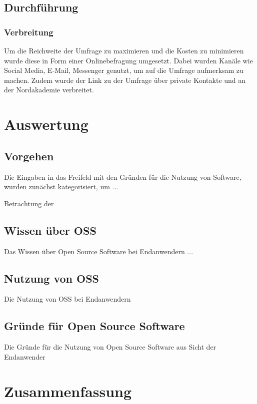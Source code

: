 \documentclass[a4paper]{article}
\begin{document}
		\subsection{Durchführung}
            \subsubsection{Verbreitung}
                Um die Reichweite der Umfrage zu maximieren und die Kosten zu minimieren wurde diese in Form einer Onlinebefragung umgesetzt. Dabei wurden Kanäle wie Social Media, E-Mail, Messenger genutzt, um auf die Umfrage aufmerksam zu machen. Zudem wurde der Link zu der Umfrage über private Kontakte und an der Nordakademie verbreitet.
                
    \section{Auswertung}
        \subsection{Vorgehen}
            Die Eingaben in das Freifeld mit den Gründen für die Nutzung von Software, wurden zunächst kategorisiert, um ...
            
            Betrachtung der 
    
        \subsection{Wissen über OSS}
            Das Wissen über Open Source Software bei Endanwendern ...
            
        \subsection{Nutzung von OSS}
            Die Nutzung von OSS bei Endanwendern
        
        \subsection{Gründe für Open Source Software}
            Die Gründe für die Nutzung von Open Source Software aus Sicht der Endanwender
    
    \section{Zusammenfassung}
    
\end{document}
